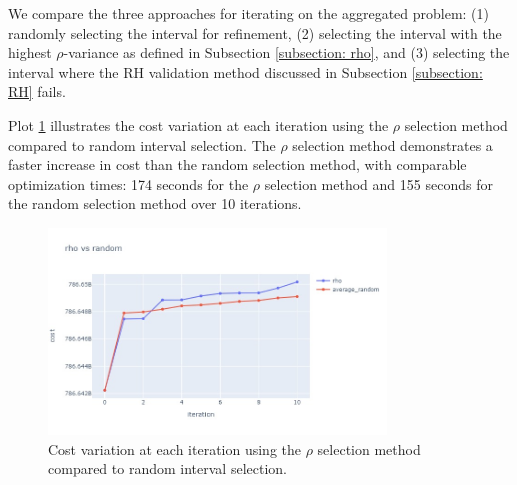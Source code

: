 \documentclass[smallextended,natbib]{svjour3}       %
\numberwithin{definition}{section}
\numberwithin{theorem}{section}
\numberwithin{proposition}{section}
\begin{document}



We compare the three approaches for iterating on the aggregated problem: 
(1) randomly selecting the interval for refinement, 
 (2) selecting the interval with the highest \(\rho\)-variance as defined in Subsection \ref{subsection: rho}, and 
 (3) selecting the interval where the RH validation method discussed in Subsection \ref{subsection: RH} fails. 

Plot \ref{fig:rho_vs_average} illustrates the cost variation at each iteration using the \(\rho\) selection method compared to random interval selection.
 The \(\rho\) selection method demonstrates a faster increase in cost than the random selection method, with comparable optimization times: 174 seconds for the \(\rho\) selection method 
 and 155 seconds for the random selection method over 10 iterations.

 \begin{figure}[htbp]
  \centering
  \includegraphics[width=0.8\textwidth]{images/rho_vas_average2.png}
  \caption{Cost variation at each iteration using the \(\rho\) selection method compared to random interval selection.}
  \label{fig:rho_vs_average}
\end{figure}
\end{document}

